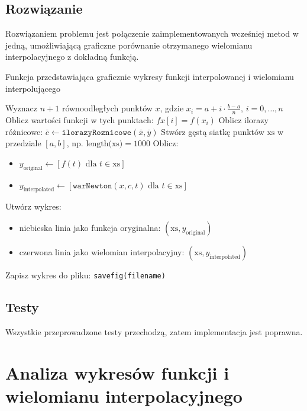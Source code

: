 \documentclass{article}
\begin{document}
\subsection{Rozwiązanie}
Rozwiązaniem problemu jest połączenie zaimplementowanych wcześniej metod w jedną, umożliwiającą graficzne porównanie otrzymanego wielomianu interpolacyjnego z dokładną funkcją.
\begin{algorithm}[H]
\caption{Funkcja przedstawiająca graficznie wykresy funkcji interpolowanej i wielomianu interpolującego}
\SetAlgoLined
{}
\begin{algorithmic}[1]
\State Wyznacz \( n+1 \) równoodległych punktów \( x \), gdzie \( x_i = a + i \cdot \frac{b-a}{n}, \, i = 0, \dots, n \)
\State Oblicz wartości funkcji w tych punktach: \( fx[i] = f(x_i) \)
\State Oblicz ilorazy różnicowe: \(\overline{c} \gets \texttt{ilorazyRoznicowe}(\overline{x}, \overline{y})  \)
\State Stwórz gęstą siatkę punktów \( \text{xs} \) w przedziale \([a, b]\), np. \( \text{length(xs)} = 1000 \)
\State Oblicz:
\begin{itemize}
    \item \( y_{\text{original}} \gets [f(t) \text{ dla } t \in \text{xs}] \)
    \item \( y_{\text{interpolated}} \gets [\texttt{warNewton}(x, c, t) \text{ dla } t \in \text{xs}] \)
\end{itemize}
\State Utwórz wykres:
\begin{itemize}
    \item niebieska linia jako funkcja oryginalna: \( (\text{xs}, y_{\text{original}}) \)
    \item czerwona linia jako wielomian interpolacyjny: \( (\text{xs}, y_{\text{interpolated}}) \)
\end{itemize}
\State Zapisz wykres do pliku: \texttt{savefig(filename)}
\end{algorithmic}
\end{algorithm}
\subsection{Testy}
Wszystkie przeprowadzone testy przechodzą, zatem implementacja jest poprawna.

\section{Analiza wykresów funkcji i wielomianu interpolacyjnego}
\end{document}
